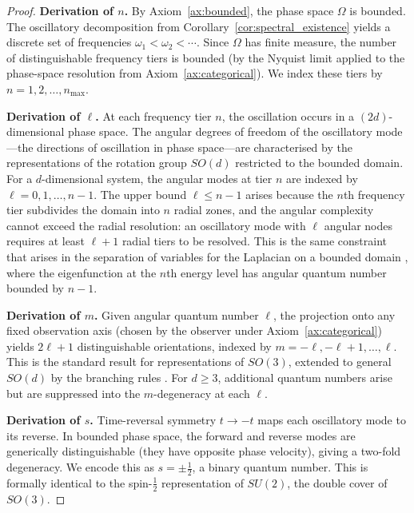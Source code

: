 \documentclass[11pt,twocolumn,a4paper]{article}
\begin{document}
\begin{proof}
\textbf{Derivation of $n$.}
By Axiom~\ref{ax:bounded}, the phase space $\Omega$ is bounded. The
oscillatory decomposition from Corollary~\ref{cor:spectral_existence}
yields a discrete set of frequencies $\omega_1 < \omega_2 < \cdots$.
Since $\Omega$ has finite measure, the number of distinguishable
frequency tiers is bounded (by the Nyquist limit \citep{nyquist1928}
applied to the phase-space resolution from Axiom~\ref{ax:categorical}).
We index these tiers by $n = 1, 2, \ldots, n_{\max}$.

\textbf{Derivation of $\ell$.}
At each frequency tier $n$, the oscillation occurs in a
$(2d)$-dimensional phase space. The angular degrees of freedom of the
oscillatory mode---the directions of oscillation in phase space---are
characterised by the representations of the rotation group $SO(d)$
restricted to the bounded domain. For a $d$-dimensional system, the
angular modes at tier $n$ are indexed by $\ell = 0, 1, \ldots, n-1$.
The upper bound $\ell \leq n - 1$ arises because the $n$th frequency
tier subdivides the domain into $n$ radial zones, and the angular
complexity cannot exceed the radial resolution: an oscillatory mode
with $\ell$ angular nodes requires at least $\ell + 1$ radial tiers
to be resolved. This is the same constraint that arises in the
separation of variables for the Laplacian on a bounded domain
\citep{courant1953}, where the eigenfunction at the $n$th energy level
has angular quantum number bounded by $n - 1$.

\textbf{Derivation of $m$.}
Given angular quantum number $\ell$, the projection onto any fixed
observation axis (chosen by the observer under
Axiom~\ref{ax:categorical}) yields $2\ell + 1$ distinguishable
orientations, indexed by $m = -\ell, -\ell + 1, \ldots, \ell$. This
is the standard result for representations of $SO(3)$, extended to
general $SO(d)$ by the branching rules \citep{weyl1946}. For
$d \geq 3$, additional quantum numbers arise but are suppressed into
the $m$-degeneracy at each $\ell$.

\textbf{Derivation of $s$.}
Time-reversal symmetry $t \to -t$ maps each oscillatory mode to its
reverse. In bounded phase space, the forward and reverse modes are
generically distinguishable (they have opposite phase velocity), giving
a two-fold degeneracy. We encode this as $s = \pm \frac{1}{2}$, a
binary quantum number. This is formally identical to the spin-$\frac{1}{2}$
representation of $SU(2)$, the double cover of $SO(3)$.
\end{proof}
\end{document}
